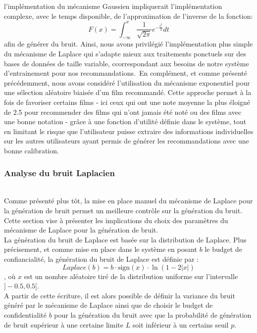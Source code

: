 \documentclass{article}
\begin{document}
l'implémentation du mécanisme Gaussien impliquerait l'implémentation complexe, avec le temps disponible, de l'approximation de l'inverse de la fonction:
\begin{equation}
    F(x) = \int_{-\infty}^{x} \frac{1}{\sqrt{2\pi}} e^{-\frac{t^2}{2}} dt
\end{equation}
afin de générer du bruit. Ainsi, nous avons privilégié l'implémentation plus simple du mécanisme de Laplace qui s’adapte mieux aux traitements
ponctuels sur des bases de données de taille variable, ccorrespondant aux besoins de notre système d'entrainement pour nos recommandations.\
En complément, et comme présenté précédemment, nous avons considéré l'utilisation du mécanisme exponentiel pour une sélection aléatoire biaisée d'un film recommandé.
Cette approche permet à la fois de favoriser certains films - ici ceux qui ont une note moyenne la plus éloigné de 2.5 pour recommender des films qui n'ont jamais été noté ou des
films avec une bonne notation - grâce à une fonction d'utilité définie dans le système, tout en limitant le risque que
l'utilisateur puisse extraire des informations individuelles sur les autres utilisateurs ayant permis de générer les recommandations avec une bonne
calibration.

\subsubsection{Analyse du bruit Laplacien}
$ $\\
Comme présenté plus tôt, la mise en place manuel du mécanisme de Laplace pour la génération de bruit permet un meilleure contrôle sur la génération du bruit. Cette section vise à présenter
les implications du choix des paramètres du mécanisme de Laplace pour la génération de bruit.\\
La génération du bruit de Laplace est basée sur la distribution de Laplace. Plus précisement, et comme mise en place dans le système en posant $b$ le budget de confiancialité, la génération du bruit de Laplace est définie par :
\begin{equation}
    Laplace(b) = b \cdot \text{sign}(x) \cdot \ln(1 - 2|x|)
    \label{eq:laplace}
\end{equation}
, où $x$ est un nombre aléatoire tiré de la distribution uniforme sur l'intervalle \( ]-0.5, 0.5[ \).\\
A partir de cette écriture, il est alors possible de définir la variance du bruit généré par le mécanisme de Laplace ainsi que de choisir le budget de confidentialité $b$ pour la génération du bruit avec que la
probabilité de génération de bruit supérieur à une certaine limite $L$ soit inférieur à un certains seuil $p$.\\
\end{document}
